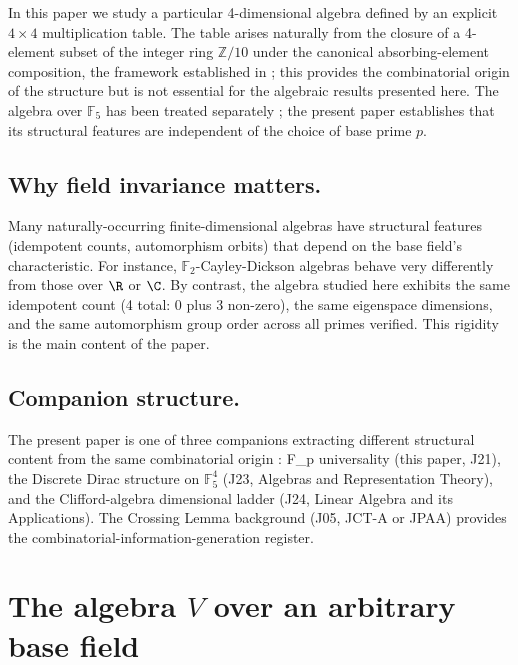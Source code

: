 \documentclass[11pt,reqno]{amsart}
\theoremstyle{plain}
\theoremstyle{definition}
\theoremstyle{remark}
\newcommand{\Z}{\mathbb{Z}}
\newcommand{\F}{\mathbb{F}}
\begin{document}
In this paper we study a particular 4-dimensional algebra defined by an
explicit $4 \times 4$ multiplication table. The table arises naturally
from the closure of a 4-element subset of the integer ring $\Z/10$
under the canonical absorbing-element composition, the framework
established in \cite{SandersGishFourCore}; this provides the
combinatorial origin of the structure but is not essential for the
algebraic results presented here. The algebra over $\F_5$ has been
treated separately \cite{SandersGishDiscreteDirac}; the present paper
establishes that its structural features are independent of the choice
of base prime $p$.

\subsection{Why field invariance matters.}
Many naturally-occurring finite-dimensional algebras have structural
features (idempotent counts, automorphism orbits) that depend on the
base field's characteristic. For instance, $\F_2$-Cayley-Dickson
algebras behave very differently from those over $\R$ or $\C$. By
contrast, the algebra studied here exhibits the same idempotent count
(4 total: 0 plus 3 non-zero), the same eigenspace dimensions, and the
same automorphism group order across all primes verified. This rigidity
is the main content of the paper.

\subsection{Companion structure.}
The present paper is one of three companions extracting different
structural content from the same combinatorial origin
\cite{SandersGishFourCore}: F_p universality (this paper, J21),
the Discrete Dirac structure on $\F_5^4$
\cite{SandersGishDiscreteDirac} (J23, Algebras and Representation
Theory), and the Clifford-algebra dimensional ladder
\cite{SandersGishCliffordLadder} (J24, Linear Algebra and its
Applications). The Crossing Lemma background \cite{SandersMayesCL}
(J05, JCT-A or JPAA) provides the combinatorial-information-generation
register.

\section{The algebra $V$ over an arbitrary base field}
\end{document}
